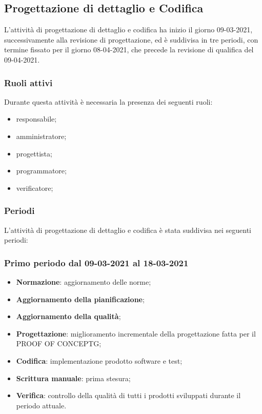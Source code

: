 	\newpage	
	
	\subsection{Progettazione di dettaglio e Codifica}
	L’attività di progettazione di dettaglio e codifica ha inizio il giorno 09-03-2021, successivamente alla
	revisione di progettazione, ed è suddivisa in tre periodi, con termine fissato per il giorno 08-04-2021,
	che precede la revisione di qualifica del 09-04-2021.
	
	\subsubsection{Ruoli attivi}
	Durante questa attività è necessaria la presenza dei seguenti ruoli:
	\begin{itemize}
	\item responsabile;
	\item amministratore;
	\item progettista;
	\item programmatore;
	\item verificatore;
	\end{itemize}

	\subsubsection{Periodi}
	L’attività di progettazione di dettaglio e codifica è stata suddivisa nei seguenti periodi:
	\subsubsection{Primo periodo dal 09-03-2021 al 18-03-2021}
	\begin{itemize}
		\item \textbf{Normazione}: aggiornamento delle norme;
		\item \textbf{Aggiornamento della pianificazione};
		\item \textbf{Aggiornamento della qualità};
		\item \textbf{Progettazione}: miglioramento incrementale della progettazione fatta per il PROOF OF CONCEPTG;
		\item \textbf{Codifica}: implementazione prodotto software e test;
		\item \textbf{Scrittura manuale}: prima stesura;
		\item \textbf{Verifica}: controllo della qualità di tutti i prodotti sviluppati durante il periodo attuale.
	\end{itemize}

